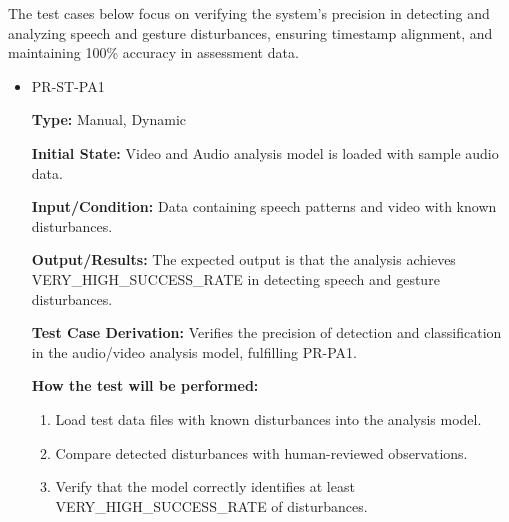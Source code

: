 \documentclass[12pt, titlepage]{article}
\begin{document}
\hspace{2em}The test cases below focus on verifying the system's precision in detecting and analyzing speech and gesture disturbances, ensuring timestamp alignment, and maintaining 100\% accuracy in assessment data.

\begin{itemize}
  \item PR-ST-PA1
  \begin{mdframed}[linewidth=0.5mm]
      \textbf{Type:} Manual, Dynamic \par
      \textbf{Initial State:} Video and Audio analysis model is loaded with sample audio data. \par
      \textbf{Input/Condition:} Data containing speech patterns and video with known \\ disturbances. \par
      \textbf{Output/Results:} The expected output is that the analysis achieves \\ VERY\_HIGH\_SUCCESS\_RATE in detecting speech and gesture disturbances. \par
      \textbf{Test Case Derivation:} Verifies the precision of detection and classification in the audio/video analysis model, fulfilling PR-PA1. \par
      \textbf{How the test will be performed:}
      \begin{enumerate}[noitemsep]
        \item Load test data files with known disturbances into the analysis model.
        \item Compare detected disturbances with human-reviewed observations.
        \item Verify that the model correctly identifies at least \\ VERY\_HIGH\_SUCCESS\_RATE of disturbances.
      \end{enumerate}
  \end{mdframed}


\end{itemize}
\end{document}
